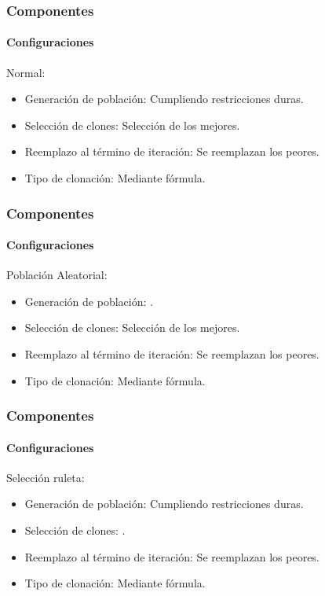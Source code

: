 \frame
{
\frametitle{Componentes}
\framesubtitle{Configuraciones}
Normal:
        \begin{itemize}
            \item Generación de población: Cumpliendo restricciones duras.
            \item Selección de clones: Selección de los mejores.
            \item Reemplazo al término de iteración:  Se reemplazan los peores.
            \item Tipo de clonación: Mediante fórmula.
        \end{itemize}
}


\frame
{
\frametitle{Componentes}
\framesubtitle{Configuraciones}
Población Aleatorial:
        \begin{itemize}
			\item Generación de población: .
            \item Selección de clones: Selección de los mejores.
            \item Reemplazo al término de iteración:  Se reemplazan los peores.
            \item Tipo de clonación: Mediante fórmula.
        \end{itemize}
}

\frame
{
\frametitle{Componentes}
\framesubtitle{Configuraciones}
Selección ruleta:

        \begin{itemize}
            \item Generación de población: Cumpliendo restricciones duras.
            \item Selección de clones: .
            \item Reemplazo al término de iteración:  Se reemplazan los peores.
            \item Tipo de clonación: Mediante fórmula.
        \end{itemize}
}

